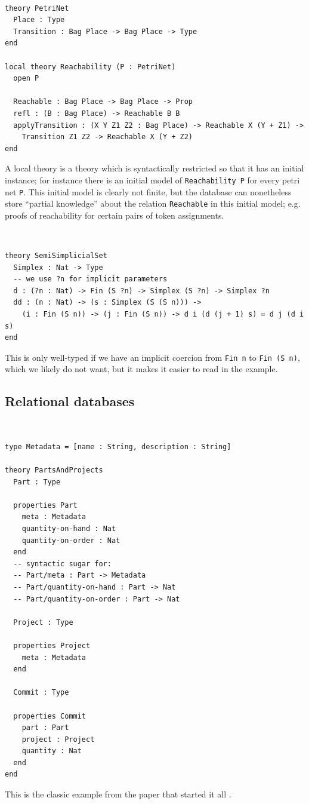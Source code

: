 \documentclass{article}
\begin{document}
\begin{example} \,

\begin{verbatim}
theory PetriNet
  Place : Type
  Transition : Bag Place -> Bag Place -> Type
end

local theory Reachability (P : PetriNet)
  open P

  Reachable : Bag Place -> Bag Place -> Prop
  refl : (B : Bag Place) -> Reachable B B
  applyTransition : (X Y Z1 Z2 : Bag Place) -> Reachable X (Y + Z1) ->
    Transition Z1 Z2 -> Reachable X (Y + Z2)
end
\end{verbatim}
A local theory is a theory which is syntactically restricted so that it has an initial instance; for instance there is an initial model of \texttt{Reachability P} for every petri net \texttt{P}. This initial model is clearly not finite, but the database can nonetheless store ``partial knowledge'' about the relation \texttt{Reachable} in this initial model; e.g. proofs of reachability for certain pairs of token assignments.
\end{example}

\begin{example} \,

\begin{verbatim}
theory SemiSimplicialSet
  Simplex : Nat -> Type
  -- we use ?n for implicit parameters
  d : (?n : Nat) -> Fin (S ?n) -> Simplex (S ?n) -> Simplex ?n
  dd : (n : Nat) -> (s : Simplex (S (S n))) ->
    (i : Fin (S n)) -> (j : Fin (S n)) -> d i (d (j + 1) s) = d j (d i s)
end
\end{verbatim}
This is only well-typed if we have an implicit coercion from \texttt{Fin n} to \texttt{Fin (S n)}, which we likely do not want, but it makes it easier to read in the example.
\end{example}
\subsection{Relational databases}

\begin{example} \,

\begin{verbatim}
type Metadata = [name : String, description : String]

theory PartsAndProjects
  Part : Type

  properties Part
    meta : Metadata
    quantity-on-hand : Nat
    quantity-on-order : Nat
  end
  -- syntactic sugar for:
  -- Part/meta : Part -> Metadata
  -- Part/quantity-on-hand : Part -> Nat
  -- Part/quantity-on-order : Part -> Nat

  Project : Type

  properties Project
    meta : Metadata
  end

  Commit : Type

  properties Commit
    part : Part
    project : Project
    quantity : Nat
  end
end
\end{verbatim}
This is the classic example from the paper that started it all \cite{codd-1970-relational}.
\end{example}
\end{document}
